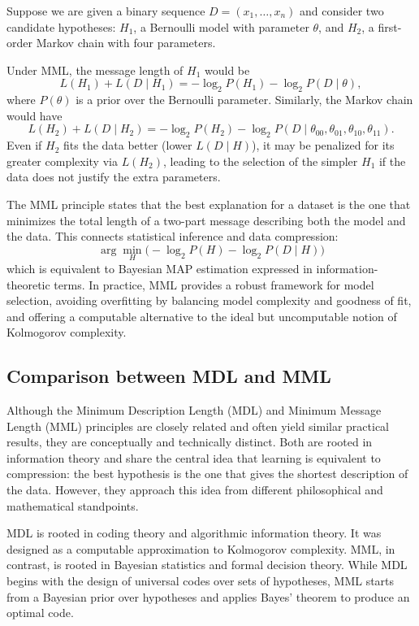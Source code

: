 \begin{example}
Suppose we are given a binary sequence $D=(x_1,\dots,x_n)$ and consider two candidate hypotheses: 
$H_1$, a Bernoulli model with parameter $\theta$, and 
$H_2$, a first-order Markov chain with four parameters.

Under MML, the message length of $H_1$ would be
\[
L(H_1) + L(D\mid H_1) = -\log_2 P(H_1) - \log_2 P(D\mid \theta),
\]
where $P(\theta)$ is a prior over the Bernoulli parameter. 
Similarly, the Markov chain would have
\[
L(H_2) + L(D\mid H_2) = -\log_2 P(H_2) - \log_2 P(D\mid \theta_{00},\theta_{01},\theta_{10},\theta_{11}).
\]
Even if $H_2$ fits the data better (lower $L(D\mid H)$), it may be penalized for its greater complexity via $L(H_2)$, leading to the selection of the simpler $H_1$ if the data does not justify the extra parameters.
\end{example}

The MML principle states that the best explanation for a dataset is the one that minimizes the total length of a two-part message describing both the model and the data. 
This connects statistical inference and data compression: 
\[
\boxed{\arg\min_H \big(-\log_2 P(H) - \log_2 P(D\mid H)\big)}
\]
which is equivalent to Bayesian MAP estimation expressed in information-theoretic terms. 
In practice, MML provides a robust framework for model selection, avoiding overfitting by balancing model complexity and goodness of fit, and offering a computable alternative to the ideal but uncomputable notion of Kolmogorov complexity.

\subsection{Comparison between MDL and MML}
\label{sec:MDL_vs_MML}

Although the Minimum Description Length (MDL) and Minimum Message Length (MML) principles are closely related and often yield similar practical results, they are conceptually and technically distinct. Both are rooted in information theory and share the central idea that learning is equivalent to compression: the best hypothesis is the one that gives the shortest description of the data. However, they approach this idea from different philosophical and mathematical standpoints.

MDL is rooted in coding theory and algorithmic information theory. It was designed as a computable approximation to Kolmogorov complexity. MML, in contrast, is rooted in Bayesian statistics and formal decision theory. 
While MDL begins with the design of universal codes over sets of hypotheses, MML starts from a Bayesian prior over hypotheses and applies Bayes’ theorem to produce an optimal code.

